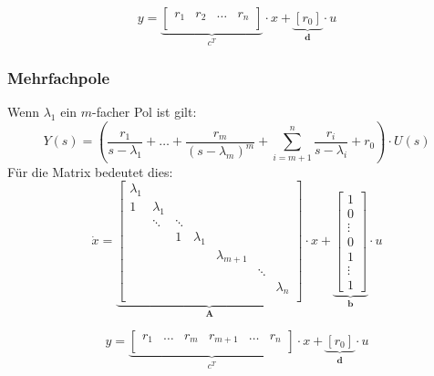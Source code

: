 \[
	y=
	\underbrace{
			\begin{bmatrix}
				r_1 & r_2 & \ldots & r_n\\
			\end{bmatrix}
	}_{\textbf{$c^T$}}
	\cdot x  +
	\underbrace{
		\left[ r_0 \right] 
	}_{\textbf{d}}
	\cdot u
\]

\subsubsection{Mehrfachpole}
Wenn $\lambda_1$ ein $m$-facher Pol ist gilt:
\[
	Y(s) = \left( \frac{r_1}{s-\lambda_1} + \ldots + \frac{r_m}{\left(s-\lambda_m\right)^m} + \sum_{i=m+1}^{n} \frac{r_i}{s-\lambda_i} + r_0\right) \cdot U(s)
\]
Für die Matrix bedeutet dies:
\[
	\dot x=
	\underbrace{
		\begin{bmatrix}
			\lambda_1 &	 		  &  		& 	& & & \\
			1 		  & \lambda_1 &  		&  	& & &\\
			 		  & \ddots 	  & \ddots 	& 	& & &\\
				  	  & 	 	  & 1 		& \lambda_1 & & & \\
			 	      &  		  &  		&  	& \lambda_{m+1} & &\\	
			 	      &  		  &  		&  	& 				& \ddots &\\
			 	      &  		  &  		&  	& 				&  & \lambda_n\\
		\end{bmatrix}
	}_{\textbf{A}}
	\cdot x +
	\underbrace{
		\begin{bmatrix}
			1 \\
			0 \\
			\vdots \\
			0 \\
			1\\
			\vdots\\
			1	
		\end{bmatrix}
	}_{\textbf{b}}
	\cdot u	
\]

\[
	y=
	\underbrace{
			\begin{bmatrix}
				r_1 & \ldots & r_m & r_{m+1} & \ldots & r_n\\
			\end{bmatrix}
	}_{\textbf{$c^T$}}
	\cdot x  +
	\underbrace{
		\left[ r_0 \right] 
	}_{\textbf{d}}
	\cdot u
\]